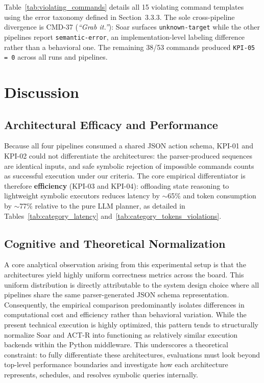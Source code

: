 \documentclass[a4paper]{article}
\begin{document}
Table~\ref{tab:violating_commands} details all 15 violating command templates using the error taxonomy defined in Section~3.3.3. The sole cross-pipeline divergence is CMD-37 (\textit{``Grab it.''}): Soar surfaces \texttt{unknown-target} while the other pipelines report \texttt{semantic-error}, an implementation-level labeling difference rather than a behavioral one. The remaining 38/53 commands produced \texttt{KPI-05 = 0} across all runs and pipelines.

\section{Discussion}

\subsection{Architectural Efficacy and Performance}
Because all four pipelines consumed a shared JSON action schema, KPI-01 and KPI-02 could not differentiate the architectures: the parser-produced sequences are identical inputs, and safe symbolic rejection of impossible commands counts as successful execution under our criteria. The core empirical differentiator is therefore \textbf{efficiency} (KPI-03 and KPI-04): offloading state reasoning to lightweight symbolic executors reduces latency by $\sim$65\% and token consumption by $\sim$77\% relative to the pure LLM planner, as detailed in Tables~\ref{tab:category_latency} and~\ref{tab:category_tokens_violations}.

\subsection{Cognitive and Theoretical Normalization}
A core analytical observation arising from this experimental setup is that the architectures yield highly uniform correctness metrics across the board. This uniform distribution is directly attributable to the system design choice where all pipelines share the same parser-generated JSON schema representation. Consequently, the empirical comparison predominantly isolates differences in computational cost and efficiency rather than behavioral variation. While the present technical execution is highly optimized, this pattern tends to structurally normalize Soar and ACT-R into functioning as relatively similar execution backends within the Python middleware. This underscores a theoretical constraint: to fully differentiate these architectures, evaluations must look beyond top-level performance boundaries and investigate how each architecture represents, schedules, and resolves symbolic queries internally.
\end{document}
